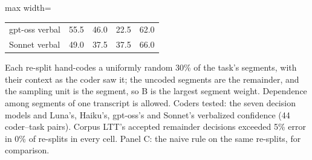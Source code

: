 \begin{table}[t]
\begin{adjustbox}{max width=\linewidth}
\begin{tabular}{lrrrr}
gpt-oss verbal & 55.5 & 46.0 & 22.5 & 62.0 \\
Sonnet verbal & 49.0 & 37.5 & 37.5 & 66.0 \\
\bottomrule
\end{tabular}
\end{adjustbox}
\par\smallskip\footnotesize\raggedright Each re-split hand-codes a uniformly random 30\% of the task's segments, with their context as the coder saw it; the uncoded segments are the remainder, and the sampling unit is the segment, so B is the largest segment weight. Dependence among segments of one transcript is allowed. Coders tested: the seven decision models and Luna's, Haiku's, gpt-oss's and Sonnet's verbalized confidence (44 coder--task pairs). Corpus LTT's accepted remainder decisions exceeded 5\% error in 0\% of re-splits in every cell. Panel C: the naive rule on the same re-splits, for comparison.
\end{table}
